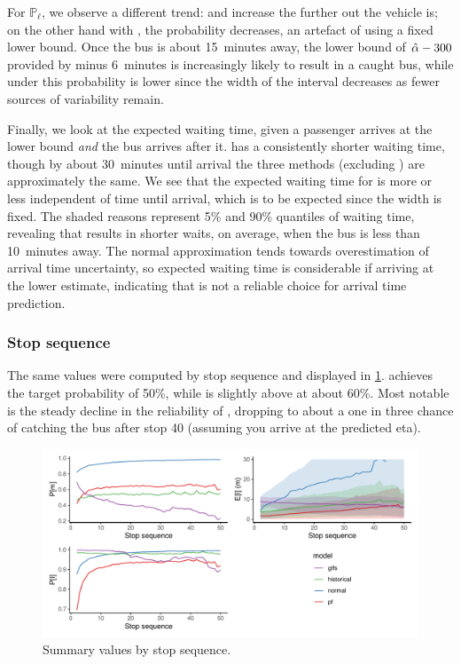 For $\mathbb{P}_\ell$, we observe a different trend: \Fpf{} and \Fhist{} increase the further out the vehicle is; on the other hand with \Fsched{}, the probability decreases, an artefact of using a fixed lower bound. Once the bus is about 15~minutes away, the lower bound of $\hat{\alpha} - 300$ provided by \Fsched{} minus 6~minutes is increasingly likely to result in a caught bus, while under \Fpf{} this probability is lower since the width of the interval decreases as fewer sources of variability remain.


Finally, we look at the expected waiting time, given a passenger arrives at the lower bound \emph{and} the bus arrives after it. \Fpf{} has a consistently shorter waiting time, though by about 30~minutes until arrival the three methods (excluding \Fnorm{}) are approximately the same. We see that the expected waiting time for \Fsched{} is more or less independent of time until arrival, which is to be expected since the width is fixed. The shaded reasons represent 5\% and 90\% quantiles of waiting time, revealing that \Fpf{} results in shorter waits, on average, when the bus is less than 10~minutes away. The normal approximation tends towards overestimation of arrival time uncertainty, so expected waiting time is considerable if arriving at the lower estimate, indicating that \Fnorm{} is not a reliable choice for arrival time prediction.


\subsubsection{Stop sequence}

The same values were computed by stop sequence and displayed in \cref{fig:model_results_pr_stop}. \Fhist{} achieves the target probability of 50\%, while \Fpf{} is slightly above at about 60\%. Most notable is the steady decline in the reliability of \Fsched{}, dropping to about a one in three chance of catching the bus after stop 40 (assuming you arrive at the predicted \gls{eta}).


\begin{knitrout}\small
{}\color{fgcolor}\begin{figure}
\includegraphics[width=\textwidth]{figure/model_results_pr_stop-1} \caption[Summary values by stop sequence]{Summary values by stop sequence.}\label{fig:model_results_pr_stop}
\end{figure}


\end{knitrout}

